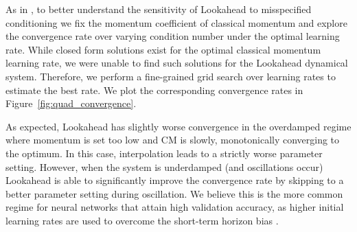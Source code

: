 As in \citet{lucas2018aggregated}, to better understand the sensitivity of Lookahead to misspecified conditioning we fix the momentum coefficient of classical momentum and explore the convergence rate over varying condition number under the optimal learning rate. While closed form solutions exist for the optimal classical momentum learning rate, we were unable to find such solutions for the Lookahead dynamical system. Therefore, we perform a fine-grained grid search over learning rates to estimate the best rate. We plot the corresponding convergence rates in Figure~\ref{fig:quad_convergence}.

As expected, Lookahead has slightly worse convergence in the overdamped regime where momentum is set too low and CM is slowly, monotonically converging to the optimum. In this case, interpolation leads to a strictly worse parameter setting. However, when the system is underdamped (and oscillations occur) Lookahead is able to significantly improve the convergence rate by skipping to a better parameter setting during oscillation. We believe this is the more common regime for neural networks that attain high validation accuracy, as higher initial learning rates are used to overcome the short-term horizon bias \citep{wu2018understanding}.




